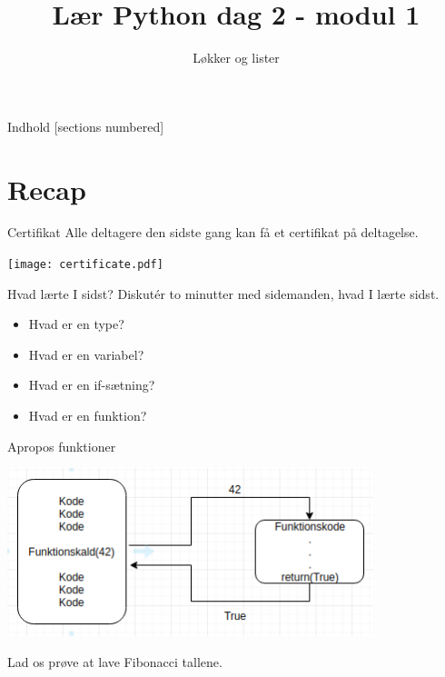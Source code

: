 

\title{Lær Python dag 2 - modul 1}
\subtitle{Løkker og lister}



\maketitle

\begin{frame}{Indhold}
  [sections numbered]
  \tableofcontents[hideallsubsections]
\end{frame}

\section{Recap}
\begin{frame}[fragile]{Certifikat}
Alle deltagere den sidste gang kan få et certifikat på deltagelse.
\begin{center}
	\texttt{[image: certificate.pdf]}
\end{center}
\end{frame}


\begin{frame}[fragile]{Hvad lærte I sidst?}
Diskutér to minutter med sidemanden, hvad I lærte sidst.

	\begin{itemize}
		\item Hvad er en type?
		\item Hvad er en variabel?
		\item Hvad er en if-sætning?
		\item Hvad er en funktion?
	\end{itemize}
\end{frame}

\begin{frame}[fragile]{Apropos funktioner}
	\begin{center}
		\includegraphics[width=0.8\textwidth]{figs/funcs.png}
	\end{center}
\pause
Lad os prøve at lave Fibonacci tallene.
\end{frame}

